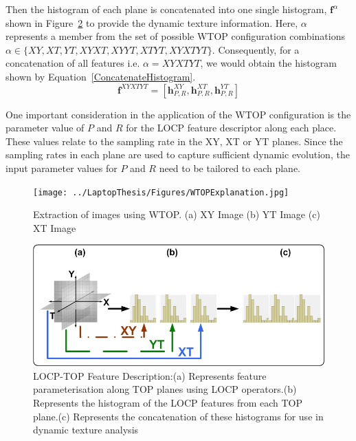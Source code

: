 \documentclass[a4paper, 10pt, conference]{ieeeconf}      %
\begin{document}
Then the histogram of each plane is concatenated into one single histogram, $\bm{f}^{\alpha}$ shown in Figure~\ref{OCPTOP} to provide the dynamic texture information. Here, $\alpha$ represents a member from the set of possible WTOP configuration combinations $\alpha\in\{XY, XT, YT, XYXT, XYYT, XTYT, XYXTYT\}$. Consequently, for a concatenation of all features i.e. $\alpha = XYXTYT$, we would obtain the histogram shown by Equation~\ref{ConcatenateHistogram}.
\begin{equation}
 \bm{f}^{XYXTYT} = [\bm{h}_{P,R}^{XY},\bm{h}_{P,R}^{XT},\bm{h}_{P,R}^{YT}]
\label{ConcatenateHistogram}
\end{equation}

One important consideration in the application of the WTOP configuration is the parameter value of $P$ and $R$ for the LOCP feature descriptor along each place. These values relate to the sampling rate in the XY, XT or YT planes. Since the sampling rates in each plane are used to capture sufficient dynamic evolution, the input parameter values for  $P$ and $R$ need to be tailored to each plane.
\begin{figure}[htp!]
\centering
 \texttt{[image: ../LaptopThesis/Figures/WTOPExplanation.jpg]}
\caption{Extraction of images using WTOP. (a) XY Image (b) YT Image (c) XT Image}
\label{TOPExplanation}
\end{figure}
\begin{figure}[htp!]
\centering
 \includegraphics[scale=0.28]{OCPTOP}
\caption{LOCP-TOP Feature Description:(a) Represents feature parameterisation along TOP planes using LOCP operators.(b) Represents the histogram of the LOCP features from each TOP plane.(c) Represents the concatenation of these histograms for use in dynamic texture analysis}
\label{OCPTOP}
\end{figure}
\end{document}
